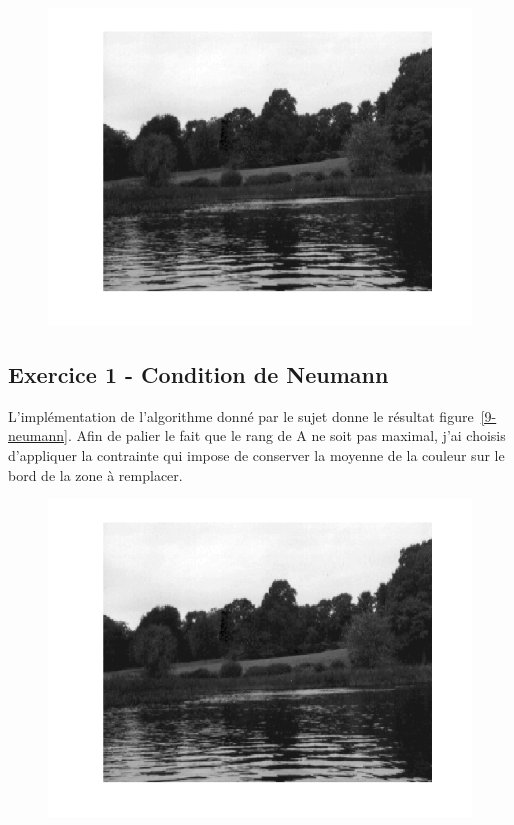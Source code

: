 \documentclass{article}
\begin{document}
\begin{figure}[!ht]
\includegraphics[width=\textwidth]{images/1/1-1-autumn_b.png}
\end{figure}

\subsection{Exercice 1 - Condition de Neumann}
L'implémentation de l'algorithme donné par le sujet donne le résultat figure~\ref{9-neumann}. Afin de palier le fait que le rang de A ne soit pas maximal, j'ai choisis d'appliquer la contrainte qui impose de conserver la moyenne de la couleur sur le bord de la zone à remplacer.

\begin{figure}[!ht]
\includegraphics[width=\textwidth]{images/1/1-1-autumn_b.png}
\end{figure}
\end{document}
